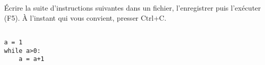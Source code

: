 \exer{}
\setcounter{numques}{0}

\'Ecrire la suite d'instructions suivantes dans un fichier, l'enregistrer puis l'exécuter (F5). \`A l'instant qui vous convient, presser Ctrl+C.
\begin{lstlisting}

a = 1
while a>0:
    a = a+1
\end{lstlisting}

